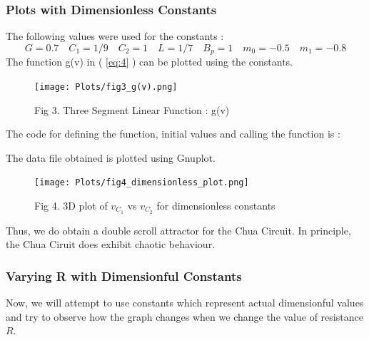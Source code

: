 \documentclass[12pt]{article}
\newcommand*{\myref}[1]{%
  \begingroup
    \hypersetup{
      linkcolor=linkequation,
      linkbordercolor=linkequation,
    }%
    \ref{#1}%
  \endgroup
}
\begin{document}
\subsubsection{Plots with Dimensionless Constants}
The following values were used for the constants :
\[ G=0.7 \quad C_1=1/9 \quad C_2=1 \quad L=1/7 \quad B_p=1 \quad m_0=-0.5 \quad m_1=-0.8 \]
The function g(v) in (\myref{eq:4}) can be plotted using the constants. 
\begin{figure}[H] %
	\centering
	\texttt{[image: Plots/fig3\_g(v).png]}
	\caption{Fig 3. Three Segment Linear Function : g(v)}
\end{figure}
The code for defining the function, initial values and calling the function is :

The data file obtained is plotted using Gnuplot.
\begin{figure}[H] %
	\centering
	\texttt{[image: Plots/fig4\_dimensionless\_plot.png]}
	\caption{Fig 4. 3D plot of $v_{C_1}$ vs $v_{C_2}$ for dimensionless constants}
\end{figure}
Thus, we do obtain a double scroll attractor for the Chua Circuit. In principle, the Chua Ciruit does exhibit chaotic behaviour. 
%
\subsubsection{Varying R with Dimensionful Constants}
Now, we will attempt to use constants which represent actual dimensionful values and try to observe how the graph changes when we change the value of resistance $R$. \linebreak
\end{document}

